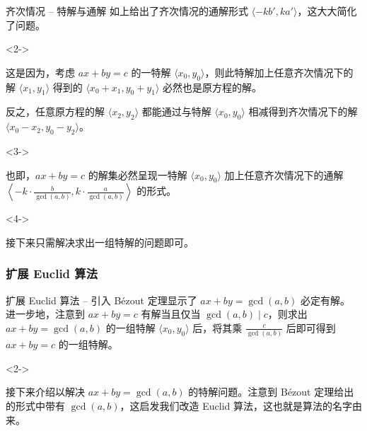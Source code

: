 \documentclass{../pkslide}
\begin{document}
\begin{frame}{齐次情况 -- 特解与通解}
  如上给出了齐次情况的通解形式 $\langle -k b', k a' \rangle$，这大大简化了问题。
  
  \begin{visibleenv}<2->
    \emptyline
    
    这是因为，考虑 $a x + b y = c$ 的一特解 $\langle x_0, y_0 \rangle$，则此特解加上任意齐次情况下的解 $\langle x_1, y_1 \rangle$ 得到的 $\langle x_0 + x_1, y_0 + y_1 \rangle$ 必然也是原方程的解。
    
    反之，任意原方程的解 $\langle x_2, y_2 \rangle$ 都能通过与特解 $\langle x_0, y_0 \rangle$ 相减得到齐次情况下的解 $\langle x_0 - x_2, y_0 - y_2 \rangle$。
  \end{visibleenv}
  
  \begin{visibleenv}<3->
    \emptyline
    
    也即，$a x + b y = c$ 的解集必然呈现一特解 $\langle x_0, y_0 \rangle$ 加上任意齐次情况下的通解 $\left\langle -k \cdot \frac{b}{\gcd(a, b)}, k \cdot \frac{a}{\gcd(a, b)} \right\rangle$ 的形式。
  \end{visibleenv}
  
  \begin{visibleenv}<4->
    \emptyline
    
    接下来只需解决求出一组特解的问题即可。
  \end{visibleenv}
\end{frame}


\subsubsection{扩展 Euclid 算法}


\begin{frame}{扩展 Euclid 算法 -- 引入}
  Bézout 定理显示了 $a x + b y = \gcd(a, b)$ 必定有解。\\
  进一步地，注意到 $a x + b y = c$ 有解当且仅当 $\gcd(a, b) \mid c$，则求出 $a x + b y = \gcd(a, b)$ 的一组特解 $\langle x_0, y_0 \rangle$ 后，将其乘 $\frac{c}{\gcd(a, b)}$ 后即可得到 $a x + b y = c$ 的一组特解。
  
  \begin{visibleenv}<2->
    \emptyline
    
    接下来介绍以解决 $a x + b y = \gcd(a, b)$ 的特解问题。注意到 Bézout 定理给出的形式中带有 $\gcd(a, b)$，这启发我们改造 Euclid 算法，这也就是算法的名字由来。
  \end{visibleenv}
\end{frame}
\end{document}
